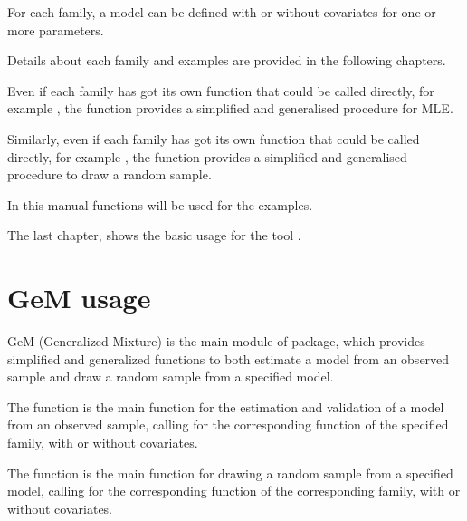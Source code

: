 \documentclass[letterpaper,10pt,english]{sphinxmanual}
\begin{document}
\sphinxAtStartPar
For each family, a model can be defined with or without covariates for one or more parameters.

\sphinxAtStartPar
Details about each family and examples are provided in the following chapters.

\sphinxAtStartPar
Even if each family has got its own  function  that
could be called directly, for example , the function  provides a
simplified and generalised procedure for MLE.

\sphinxAtStartPar
Similarly, even if each family has got its own  function  that
could be called directly, for example , the function  provides a
simplified and generalised procedure to draw a random sample.

\sphinxAtStartPar
In this manual  functions will be used for the examples.

\sphinxAtStartPar
The last chapter, shows the basic usage for the tool .


\section{GeM usage}
\label{\detokenize{manual:gem-usage}}
\sphinxAtStartPar
GeM (Generalized Mixture) is the main module of  package, which provides simplified and
generalized functions to both estimate a model from an observed sample and draw a random sample from a
specified model.

\sphinxAtStartPar
The function  is the main function for the estimation and
validation of a model from an observed sample, calling for the corresponding  function of
the specified family, with or without covariates.

\sphinxAtStartPar
The function  is the main function for drawing a random sample from a specified model,
calling for the corresponding  function of the corresponding family,
with or without covariates.
\end{document}

